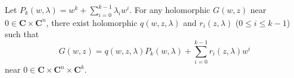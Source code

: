 Let $P_k(w, \lambda) = w^k + \sum_{i=0}^{k-1} \lambda_i w^i$. For any holomorphic $G(w, z)$ near $0 \in \mathbf{C} \times \mathbf{C}^n$, there exist holomorphic $q(w, z, \lambda)$ and $r_i(z, \lambda)$ ($0 \leq i \leq k-1$) such that
$$G(w, z) = q(w, z, \lambda) P_k(w, \lambda) + \sum_{i=0}^{k-1} r_i(z, \lambda) w^i$$
near $0 \in \mathbf{C} \times \mathbf{C}^n \times \mathbf{C}^k$.
